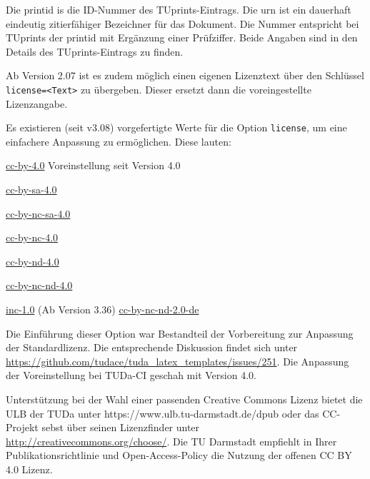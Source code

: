 \documentclass[
	ngerman,%
	accentcolor=9c,%
	ruledheaders=section,%
	class=report,%
	thesis={type=bachelor},%
	fontsize=11pt,%
	parskip=half-,%
	custommargins=true,%
	marginpar=false,%
]{tudapub}
\begin{document}
\begin{description}
	      Die printid is die ID-Nummer des TUprints-Eintrags. Die urn ist ein dauerhaft eindeutig zitierfähiger Bezeichner für das Dokument. Die Nummer entspricht bei TUprints der printid mit Ergänzung einer Prüfziffer. Beide Angaben sind in den Details des TUprints-Eintrags zu finden.

	      Ab Version 2.07 ist es zudem möglich einen eigenen Lizenztext über den Schlüssel \verb|license=<Text>| zu übergeben. Dieser ersetzt dann die voreingestellte Lizenzangabe.

	      Es existieren (seit v3.08) vorgefertigte Werte für die Option \verb|license|, um eine einfachere Anpassung zu ermöglichen. Diese lauten:

	      \parbox[t]{.5\linewidth}{%
		      \ttfamily
		      \href{https://creativecommons.org/licenses/by/4.0/}{cc-by-4.0} \textnormal{Voreinstellung seit Version 4.0}\par
		      \href{https://creativecommons.org/licenses/by-sa/4.0/}{cc-by-sa-4.0}\par
		      \href{https://creativecommons.org/licenses/by-nc-sa/4.0/}{cc-by-nc-sa-4.0}\par
		      \href{https://creativecommons.org/licenses/by-nc-/4.0/}{cc-by-nc-4.0}\par
	      }%
	      \parbox[t]{.5\linewidth}{
		      \ttfamily
		      \href{https://creativecommons.org/licenses/by-nd/4.0/}{cc-by-nd-4.0}\par
		      \href{https://creativecommons.org/licenses/by-nc-nd/4.0/}{cc-by-nc-nd-4.0}\par
		      \href{https://rightsstatements.org/page/InC/1.0/}{inc-1.0}\textnormal{ (Ab Version 3.36)}
		      \href{https://creativecommons.org/licenses/by-nc-nd/2.0/}{cc-by-nc-nd-2.0-de}\par
	      }

	      Die Einführung dieser Option war Bestandteil der Vorbereitung zur Anpassung der Standardlizenz.
	      Die entsprechende Diskussion findet sich unter \url{https://github.com/tudace/tuda_latex_templates/issues/251}. Die Anpassung der Voreinstellung bei TUDa-CI geschah mit Version 4.0.

	      Unterstützung bei der Wahl einer passenden Creative Commons Lizenz bietet die ULB der TUDa unter https://www.ulb.tu-darmstadt.de/dpub  oder  das CC-Projekt sebst über seinen Lizenzfinder unter \url{http://creativecommons.org/choose/}.
	      Die TU Darmstadt empfiehlt in Ihrer Publikationsrichtlinie und Open-Access-Policy die Nutzung der offenen CC BY 4.0 Lizenz.


\end{description}
\end{document}
